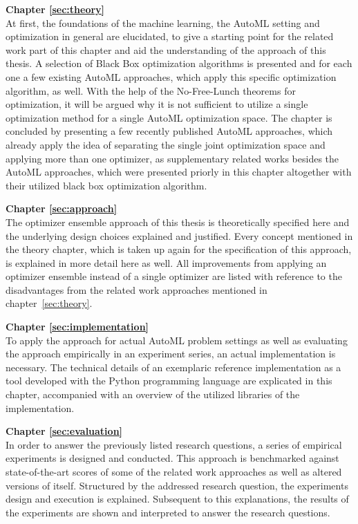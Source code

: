 \textbf{Chapter \ref{sec:theory}} \\[0.2em]
At first, the foundations of the machine learning, the AutoML setting and optimization in general are elucidated, to give a starting point for the related work part of this chapter and aid the understanding of the approach of this thesis.
A selection of Black Box optimization algorithms is presented and for each one a few existing AutoML approaches, which apply this specific optimization algorithm, as well.\newline
With the help of the No-Free-Lunch theorems for optimization, it will be argued why it is not sufficient to utilize a single optimization method for a single AutoML optimization space.\newline
The chapter is concluded by presenting a few recently published AutoML approaches, which already apply the idea of separating the single joint optimization space and applying more than one optimizer, as supplementary related works besides the AutoML approaches, which were presented priorly in this chapter altogether with their utilized black box optimization algorithm.

\textbf{Chapter \ref{sec:approach}} \\[0.2em]
The optimizer ensemble approach of this thesis is theoretically specified here and the underlying design choices explained and justified.
Every concept mentioned in the theory chapter, which is taken up again for the specification of this approach, is explained in more detail here as well.\newline
All improvements from applying an optimizer ensemble instead of a single optimizer are listed with reference to the disadvantages from the related work approaches mentioned in chapter~\ref{sec:theory}.

\textbf{Chapter \ref{sec:implementation}} \\[0.2em]
To apply the approach for actual AutoML problem settings as well as evaluating the approach empirically in an experiment series, an actual implementation is necessary.
The technical details of an exemplaric reference implementation as a tool developed with the Python programming language are explicated in this chapter, accompanied with an overview of the utilized libraries of the implementation.

\textbf{Chapter \ref{sec:evaluation}} \\[0.2em]
In order to answer the previously listed research questions, a series of empirical experiments is designed and conducted.\newline
This approach is benchmarked against state-of-the-art scores of some of the related work approaches as well as altered versions of itself.
Structured by the addressed research question, the experiments design and execution is explained.
Subsequent to this explanations, the results of the experiments are shown and interpreted to answer the research questions.

